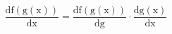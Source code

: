 \[ \frac{\mathrm{df(g(x))}}{\mathrm{dx}} =  
\frac{\mathrm{df(g(x))}}{\mathrm{dg}} \cdot \frac{\mathrm{dg(x)}}{\mathrm{dx}} \]